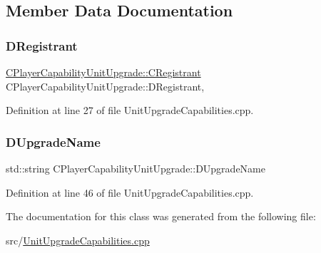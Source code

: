 \subsection{Member Data Documentation}
\hypertarget{classCPlayerCapabilityUnitUpgrade_a7c078a1318b7cf56d1810ccd46b8fd8d}{}\label{classCPlayerCapabilityUnitUpgrade_a7c078a1318b7cf56d1810ccd46b8fd8d} 
\subsubsection{\texorpdfstring{D\+Registrant}{DRegistrant}}
{\footnotesize\ttfamily \hyperlink{classCPlayerCapabilityUnitUpgrade_1_1CRegistrant}{C\+Player\+Capability\+Unit\+Upgrade\+::\+C\+Registrant} C\+Player\+Capability\+Unit\+Upgrade\+::\+D\+Registrant\hspace{0.3cm}{\ttfamily [static]}, {\ttfamily [protected]}}



Definition at line 27 of file Unit\+Upgrade\+Capabilities.\+cpp.

\hypertarget{classCPlayerCapabilityUnitUpgrade_a5de8bffd6935c699f431329ad4ee5eec}{}\label{classCPlayerCapabilityUnitUpgrade_a5de8bffd6935c699f431329ad4ee5eec} 
\subsubsection{\texorpdfstring{D\+Upgrade\+Name}{DUpgradeName}}
{\footnotesize\ttfamily std\+::string C\+Player\+Capability\+Unit\+Upgrade\+::\+D\+Upgrade\+Name\hspace{0.3cm}{\ttfamily [protected]}}



Definition at line 46 of file Unit\+Upgrade\+Capabilities.\+cpp.



The documentation for this class was generated from the following file\+:\begin{DoxyCompactItemize}
\item 
src/\hyperlink{UnitUpgradeCapabilities_8cpp}{Unit\+Upgrade\+Capabilities.\+cpp}\end{DoxyCompactItemize}
